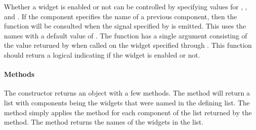 Whether a widget is enabled or not can be controlled by specifying
values for , , and
. If the component  specifies
the name of a previous component, then the function 
will be consulted when the signal specified by 
is emitted. This uses the  names with a default
value of . The  function has
a single argument consisting of the value returned by 
when called on the widget specified through . This
function should return a logical indicating if the widget is enabled
or not.

\paragraph{Methods}
The constructor returns an object with a few methods. The
\method{[}{gformlayout} method will return a list with
components being the widgets that were named in the defining list. The
 method simply applies the 
method for each component of the list returned by the \code{[}
method. The  method returns the names of the widgets in the list.


